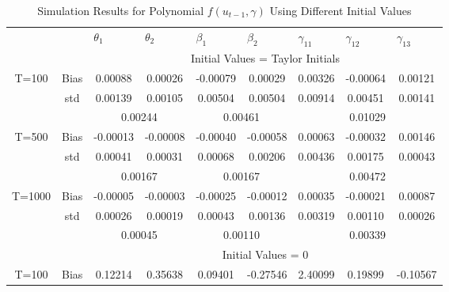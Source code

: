 \documentclass[a4paper,12pt,times,numbered,print,index]{report}
\numberwithin{equation}{section}
\begin{document}
\begin{table}[htbp]
	\centering
	\caption{Simulation Results for Polynomial $f\left( u_{t-1},\gamma\right)$ Using Different Initial Values}
	\begin{adjustbox}{max width=0.8\textwidth}
	\begin{tabular}{ccccccccc}
		\toprule
		&       & \multicolumn{1}{l}{$\theta_1$} & \multicolumn{1}{l}{$\theta_2$} & \multicolumn{1}{l}{$\beta_1$} & \multicolumn{1}{l}{$\beta_2$} & \multicolumn{1}{l}{$\gamma_{11}$} & \multicolumn{1}{l}{$\gamma_{12}$} & \multicolumn{1}{l}{$\gamma_{13}$} \\
		&       & \multicolumn{7}{c}{Initial Values = Taylor Initials} \\
		\midrule
		\multirow{3}[1]{*}{T=100} & Bias  & 0.00088 & 0.00026 & -0.00079 & 0.00029 & 0.00326 & -0.00064 & 0.00121 \\
		& std   & 0.00139 & 0.00105 & 0.00504 & 0.00504 & 0.00914 & 0.00451 & 0.00141 \\
		&       & \multicolumn{2}{c}{0.00244} & \multicolumn{2}{c}{0.00461} & \multicolumn{3}{c}{0.01029} \\
		\multirow{3}[0]{*}{T=500} & Bias  & -0.00013 & -0.00008 & -0.00040 & -0.00058 & 0.00063 & -0.00032 & 0.00146 \\
		& std   & 0.00041 & 0.00031 & 0.00068 & 0.00206 & 0.00436 & 0.00175 & 0.00043 \\
		&       & \multicolumn{2}{c}{0.00167} & \multicolumn{2}{c}{0.00167} & \multicolumn{3}{c}{0.00472} \\
		\multirow{3}[1]{*}{T=1000} & Bias  & -0.00005 & -0.00003 & -0.00025 & -0.00012 & 0.00035 & -0.00021 & 0.00087 \\
		& std   & 0.00026 & 0.00019 & 0.00043 & 0.00136 & 0.00319 & 0.00110 & 0.00026 \\
		&       & \multicolumn{2}{c}{0.00045} & \multicolumn{2}{c}{0.00110} & \multicolumn{3}{c}{0.00339} \\
		\midrule
		&       & \multicolumn{7}{c}{Initial Values = 0} \\
		\midrule
		\multirow{3}[1]{*}{T=100} & Bias  & 0.12214 & 0.35638 & 0.09401 & -0.27546 & 2.40099 & 0.19899 & -0.10567 \\

\end{tabular}
\end{adjustbox}
\end{table}
\end{document}
